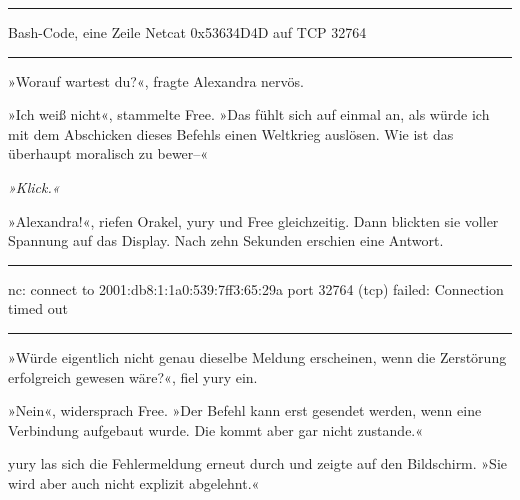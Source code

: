 \noindent \parbox{\textwidth}{ \vspace{3ex} \hrule \vspace{3ex}

    \begin{tiny}
    \begin{ttfamily}

\noindent Bash-Code, eine Zeile Netcat 0x53634D4D auf TCP 32764

    \end{ttfamily}
    \end{tiny}

\vspace{3ex} \hrule \vspace{3ex} }

»Worauf wartest du?«, fragte Alexandra nervös.

»Ich weiß nicht«, stammelte Free. »Das fühlt sich auf einmal an, als würde ich mit dem Abschicken dieses Befehls einen Weltkrieg auslösen. Wie ist das überhaupt moralisch zu bewer–«

\textit{»Klick.«}

»Alexandra!«, riefen Orakel, yury und Free gleichzeitig. Dann blickten sie voller Spannung auf das Display. Nach zehn Sekunden erschien eine Antwort.

\noindent \parbox{\textwidth}{ \vspace{3ex} \hrule \vspace{3ex}

    \begin{tiny}
    \begin{ttfamily}

\noindent nc: connect to 2001:db8:1:1a0:539:7ff3:65:29a port 32764 (tcp) failed: Connection timed out

    \end{ttfamily}
    \end{tiny}

\vspace{3ex} \hrule \vspace{3ex} }

»Würde eigentlich nicht genau dieselbe Meldung erscheinen, wenn die Zerstörung erfolgreich gewesen wäre?«, fiel yury ein.

»Nein«, widersprach Free. »Der Befehl kann erst gesendet werden, wenn eine Verbindung aufgebaut wurde. Die kommt aber gar nicht zustande.«

yury las sich die Fehlermeldung erneut durch und zeigte auf den Bildschirm. »Sie wird aber auch nicht explizit abgelehnt.«

